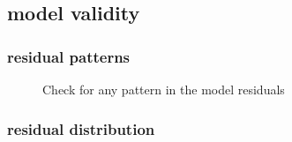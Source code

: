 \documentclass[
  a4paper,
]{scrbook}
\begin{document}
\subsection{model validity}\label{model-validity}

\subsubsection{residual patterns}\label{residual-patterns}

\begin{figure}[ht]


\caption{\label{fig-pd-resid-seq}Check for any pattern in the model
residuals}

\end{figure}%

\subsubsection{residual distribution}\label{residual-distribution}
\end{document}
